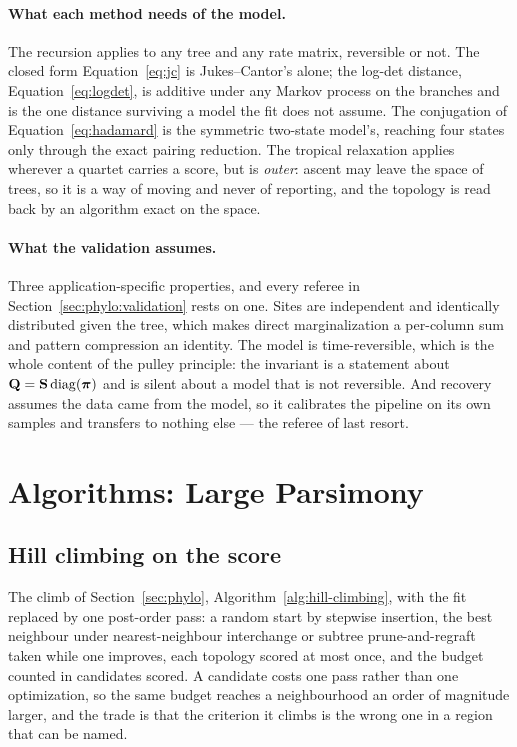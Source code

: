 \documentclass[11pt,a4paper]{article}
\begin{document}
\paragraph{What each method needs of the model.}
The recursion applies to any tree and any rate matrix, reversible or not. The
closed form Equation~\ref{eq:jc} is Jukes--Cantor's alone; the log-det
distance, Equation~\ref{eq:logdet}, is additive under any Markov process on the
branches and is the one distance surviving a model the fit does not assume. The
conjugation of Equation~\ref{eq:hadamard} is the symmetric two-state model's,
reaching four states only through the exact pairing reduction. The tropical
relaxation applies wherever a quartet carries a score, but is \emph{outer}:
ascent may leave the space of trees, so it is a way of moving and never of
reporting, and the topology is read back by an algorithm exact on the space.

\paragraph{What the validation assumes.}
Three application-specific properties, and every referee in
Section~\ref{sec:phylo:validation} rests on one. Sites are independent and
identically distributed given the tree, which makes direct marginalization a
per-column sum and pattern compression an identity. The model is
time-reversible, which is the whole content of the pulley principle: the
invariant is a statement about $\mathbf{Q} = \mathbf{S} \operatorname{diag}(\boldsymbol{\pi})$ and is
silent about a model that is not reversible. And recovery assumes the data came
from the model, so it calibrates the pipeline on its own samples and transfers
to nothing else --- the referee of last resort.

\section{Algorithms: Large Parsimony}
\label{sec:parsimony:algorithms}

\subsection{Hill climbing on the score}
The climb of Section~\ref{sec:phylo}, Algorithm~\ref{alg:hill-climbing},
with the fit replaced by one post-order pass: a random start by stepwise insertion, the best neighbour
under nearest-neighbour interchange or subtree prune-and-regraft taken while
one improves, each topology scored at most once, and the budget counted in
candidates scored. A candidate costs one pass rather than one optimization,
so the same budget reaches a neighbourhood an order of magnitude larger, and
the trade is that the criterion it climbs is the wrong one in a region that
can be named.
\end{document}
